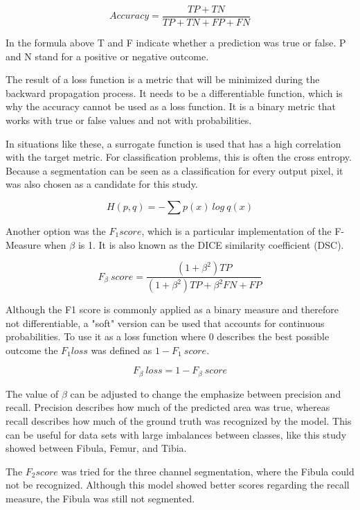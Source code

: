 \begin{equation}
Accuracy = \frac{TP+TN}{TP+TN+FP+FN}
\end{equation}

In the formula above T and F indicate whether a prediction was true or false. P and N stand for a positive or negative outcome.

The result of a loss function is a metric that will be minimized during the backward propagation process. It needs to be a differentiable function, which is why the accuracy cannot be used as a loss function. It is a binary metric that works with true or false values and not with probabilities.

In situations like these, a surrogate function is used that has a high correlation with the target metric. For classification problems, this is often the cross entropy. Because a segmentation can be seen as a classification for every output pixel, it was also chosen as a candidate for this study.

\begin{equation}
H(p, q) = -\sum p(x) \ log \ q(x)
\end{equation}

Another option was the $F_1 score$, which is a particular implementation of the F-Measure when $ \beta $ is 1. It is also known as the DICE similarity coefficient (DSC).

\begin{equation}
F_\beta \ score= \frac{(1 + \beta^2) TP}{(1+\beta^2)TP+\beta^2FN+FP}
\end{equation}

Although the F1 score is commonly applied as a binary measure and therefore not differentiable, a "soft" version can be used that accounts for continuous probabilities. To use it as a loss function where 0 describes the best possible outcome the $F_1 loss$ was defined as $ 1 - F_1 \ score $.

\begin{equation}
F_\beta \ loss = 1 - F_\beta \ score
\end{equation}

The value of $ \beta $ can be adjusted to change the emphasize between precision and recall. Precision describes how much of the predicted area was true, whereas recall describes how much of the ground truth was recognized by the model. This can be useful for data sets with large imbalances between classes, like this study showed between Fibula, Femur, and Tibia. 

The $F_2 score$ was tried for the three channel segmentation, where the Fibula could not be recognized. Although this model showed better scores regarding the recall measure, the Fibula was still not segmented.

